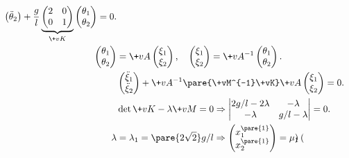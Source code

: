\documentclass[../LectureNotes.tex]{subfiles}
\begin{document}
\begin{sample}
\begin{ex}
\begin{align*}
\begin{pmatrix}
                \ddot{\theta}_2
            \end{pmatrix} + \frac{g}{l} \underbrace{\begin{pmatrix}
                2 & 0 \\ 0 & 1
            \end{pmatrix}}_{\+vK}\begin{pmatrix}
                \theta_1 \\ \theta_2
            \end{pmatrix} = 0. \\
            \begin{pmatrix}
                \theta_1 \\ \theta_2
            \end{pmatrix} &= \+vA \begin{pmatrix}
                \xi_1 \\ \xi_2
            \end{pmatrix},\quad \begin{pmatrix}
                \xi_1 \\ \xi_2
            \end{pmatrix} = \+vA^{-1}\begin{pmatrix}
                \theta_1 \\ \theta_2
            \end{pmatrix}. \\
            & \begin{pmatrix}
                \ddot{\xi}_1 \\ \ddot{\xi}_2
            \end{pmatrix} + \+vA^{-1}\pare{\+vM^{-1}\+vK}\+vA \begin{pmatrix}
                \xi_1 \\ \xi_2
            \end{pmatrix} = 0. \\
            & \det{\+vK - \lambda \+vM} = 0 \Rightarrow \begin{vmatrix}
                2g/l - 2\lambda & -\lambda \\ -\lambda & g/l - \lambda
            \end{vmatrix} = 0. \\
            \lambda &= \lambda_1 = \pare{2\sqrt{2}}g/l\Rightarrow \begin{pmatrix}
                x_1^{\pare{1}} \\ x_2^{\pare{1}}
            \end{pmatrix} = \mu_1 \begin{pmatrix}

\end{pmatrix}
\end{align*}
\end{ex}
\end{sample}
\end{document}
